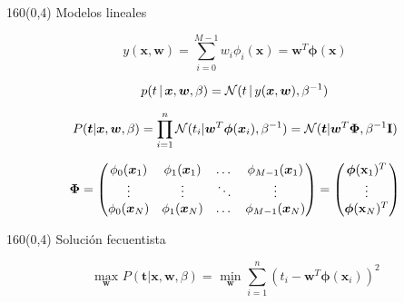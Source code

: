 \documentclass[shownotes,aspectratio=169]{beamer}
\begin{document}
\begin{frame}[plain]
\begin{textblock}{160}(0,4)
\centering \Large Modelos lineales
\end{textblock}
 \vspace{1.25cm}

\begin{equation*}
y(\bm{x},\bm{w}) = \sum_{i=0}^{M-1} w_i \phi_i(\bm{x}) = \bm{w}^T \bm{\phi}(\bm{x})
\end{equation*}

\vspace{0.5cm}
\pause
%

 \begin{equation*}
p(t \, | \, \bm{x}, \bm{w}, \beta) = \mathcal{N}(t \, | \, y(\bm{x},\bm{w}) , \beta^{-1})
\end{equation*}
\vspace{0.025cm}
\pause

\begin{equation*}
P(\bm{t} | \bm{x}, \bm{w}, \beta) = \prod_{i=1}^n \mathcal{N}(t_i | \bm{w}^T \bm{\phi}(\bm{x}_i) , \beta^{-1}) = \mathcal{N}(\bm{t}|\bm{w}^T \bm{\Phi}, \beta^{-1} \mathbf{I})
\end{equation*}
\vspace{0.05cm}
\pause

\begin{equation*}
 \bm{\Phi} =
  \begin{pmatrix}
    \phi_0(\bm{x}_1) & \phi_1(\bm{x}_1) & \dots & \phi_{M-1}(\bm{x}_1)\\
    \vdots & \vdots & \ddots & \vdots \\
    \phi_0(\bm{x}_N) & \phi_1(\bm{x}_N) & \dots & \phi_{M-1}(\bm{x}_N)
  \end{pmatrix}
  =
  \begin{pmatrix}
   \bm{\phi}(\mathbf{x}_1)^T \\
   \vdots \\
   \bm{\phi}(\mathbf{x}_N)^T \\
  \end{pmatrix}
\end{equation*}


\end{frame}



\begin{frame}[plain]
\begin{textblock}{160}(0,4)
 \centering \Large Solución fecuentista
\end{textblock}
\vspace{1.25cm}


\begin{equation*}
 \underset{\bm{w}}{\text{ max }} P(\bm{t} | \bm{x}, \bm{w}, \beta) = \underset{\bm{w}}{\text{ min }} \sum_{i=1}^{n}  (t_i - \bm{w}^T\bm{\phi}(\bm{x}_i))^2
\end{equation*}

\end{frame}
\end{document}
